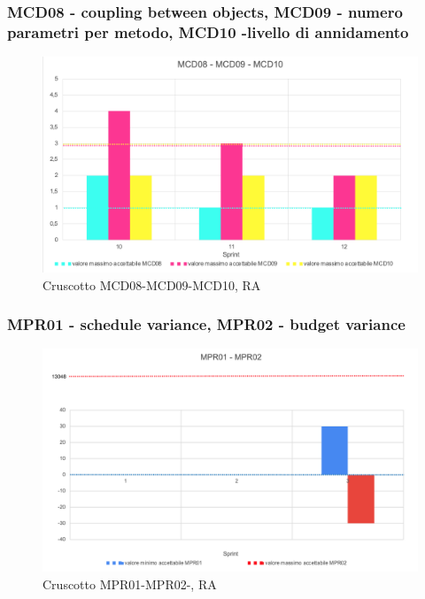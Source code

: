\subsubsection*{MCD08 - coupling between objects, MCD09 - numero parametri per metodo, MCD10 -livello di annidamento }

\begin{figure}[H] 
    \centering
    \includegraphics[scale = 0.8]{immagini/ImmRA/MCD080910.png}
    \caption{Cruscotto MCD08-MCD09-MCD10, RA}
\end{figure}

\subsubsection*{MPR01 - schedule variance, MPR02 - budget variance}

\begin{figure}[H] 
    \centering
    \includegraphics[scale = 0.6]{immagini/ImmRA/MPR0102.png}
    \caption{Cruscotto MPR01-MPR02-, RA}
\end{figure}

